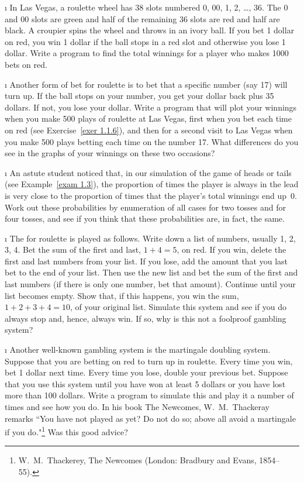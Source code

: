 \begin{LJSItem}
\i\label{exer 1.1.6} In Las Vegas, a roulette wheel has 38 slots
numbered 0, 00, 1, 2, \dots, 36.  The 0 and 00 slots are green and half of
the
remaining 36 slots are red and half are black.  A croupier spins the wheel
and
throws in an ivory ball.  If you bet 1 dollar on red, you win 1 dollar if the
ball stops in a red slot and otherwise you lose 1 dollar.  Write a program to
find the total winnings for a player who makes 1000 bets on red.

\i\label{exer 1.1.7} Another form of bet for roulette is to bet that a
specific number (say 17) will turn up.  If the ball stops on your number, you
get your dollar back plus 35 dollars.  If not, you lose your dollar.  Write a
program that will plot your winnings when you make 500 plays of roulette at
Las
Vegas, first when you bet each time on red (see Exercise~\ref{exer 1.1.6}), 
and then for a second visit to Las Vegas when you make 500 plays betting each
time
on the number 17.  What differences do you see in the graphs of your winnings
on
these two occasions?

\i\label{exer 1.1.8} An astute student noticed that, in our simulation of
the game of heads
or tails (see Example~\ref{exam 1.3}), the proportion of times the
player is always in the lead is very close to the proportion of times that
the
player's total winnings end up~0.  Work out these probabilities by
enumeration
of all cases for two tosses and for four tosses, and see if you think that
these probabilities are, in fact, the same.

\i\label{exer 1.1.9} The  
for roulette is played
as follows.  Write down a list of numbers, usually 1, 2, 3, 4.  Bet the sum
of
the first and last, $1 + 4 = 5$, on red.  If you win, delete the first and
last
numbers from your list.  If you lose, add the amount that you last bet to the
end of your list.  Then use the new list and bet the sum of the first and
last
numbers (if there is only one number, bet that amount).  Continue until your
list becomes empty.  Show that, if this happens, you win the sum, $1 + 2 + 3
+ 4
= 10$, of your original list.  Simulate this system and see if you do always
stop and, hence, always win.  If so, why is this not a foolproof gambling
system?

\i\label{exer 1.1.10} Another well-known gambling system is the \emx
{martingale doubling system}.  
Suppose that you are betting on red to turn up
in roulette.  Every time you win, bet 1 dollar next time.  Every time you
lose,
double your previous bet.  Suppose that you use this system until you have won at least 5
dollars or you have lost more than 100 dollars.  Write a program to simulate
this and play it a number of times and see how you do.  In his book
\emx
{The Newcomes,} W.~M.~Thackeray remarks 
``You have not played as yet?  Do not do
so; above all avoid a martingale if you do."\footnote{W.~M.~Thackerey, \emx
{The
Newcomes} (London: Bradbury and Evans, 1854--55).}  Was this good advice?


\end{LJSItem}
